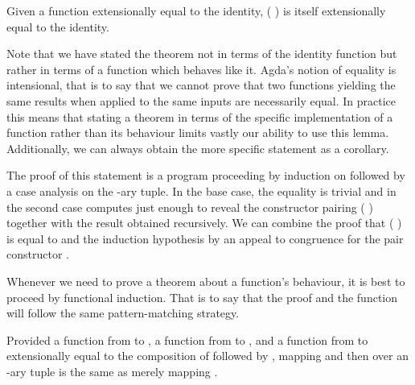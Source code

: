 \begin{lemma}
Given a function  extensionally equal to the identity,
{( )} is itself extensionally
equal to the identity.
\end{lemma}

\begin{technique} Note that we have stated
the theorem not in terms of the identity function but rather in
terms of a function which behaves like it. Agda's notion of equality
is intensional, that is to say that we cannot prove that two functions
yielding the same results when applied to the same inputs are necessarily
equal. In practice this means that stating a theorem in terms of the
specific implementation of a function rather than its behaviour limits
vastly our ability to use this lemma. Additionally, we can always
obtain the more specific statement as a corollary.
\end{technique}

The proof of this statement is a program proceeding by induction
on  followed by a case analysis on the -ary tuple.
In the base case, the equality is trivial and in the second case
 computes just enough to reveal
the constructor pairing {( )} together with the result
obtained recursively. We can combine the proof that {( )}
is equal to  and the induction hypothesis by an appeal to
congruence for the pair constructor \AIC{\_,\_}.


\begin{technique} Whenever we need to prove
a theorem about a function's behaviour, it is best to proceed by
functional induction. That is to say that the proof and the function
will follow the same pattern-matching strategy.
\end{technique}

\begin{lemma}
Provided a function  from  to ,
a function  from  to , and
a function  from  to  extensionally equal to the
composition of  followed by ,
mapping  and then  over an -ary
tuple  is the same as merely mapping .
\end{lemma}


